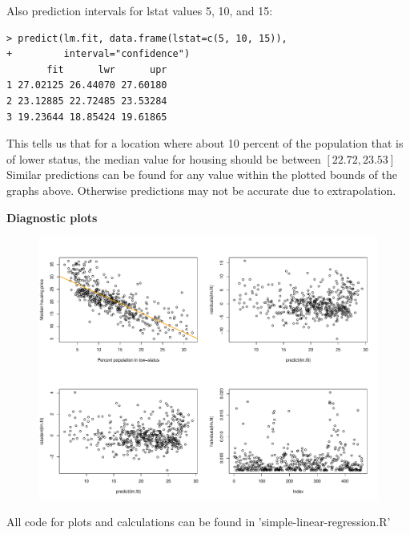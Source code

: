 \documentclass{article}
\begin{document}
Also prediction intervals for lstat values 5, 10, and 15:

\begin{verbatim}
> predict(lm.fit, data.frame(lstat=c(5, 10, 15)),
+         interval="confidence")
       fit      lwr      upr
1 27.02125 26.44070 27.60180
2 23.12885 22.72485 23.53284
3 19.23644 18.85424 19.61865
\end{verbatim}

This tells us that for a location where about 10 percent of the population that
is of lower status, the median value for housing should be between $[22.72, 23.53]$
Similar predictions can be found for any value within the plotted bounds of the graphs
above. Otherwise predictions may not be accurate due to extrapolation.


\pagebreak

{\large \bf Diagnostic plots}
\begin{figure}[!ht]
  \centering
  \includegraphics[width=1.00\linewidth]{plots/diagnostic-plots.pdf}
\end{figure}

All code for plots and calculations can be found in 'simple-linear-regression.R'
\end{document}
